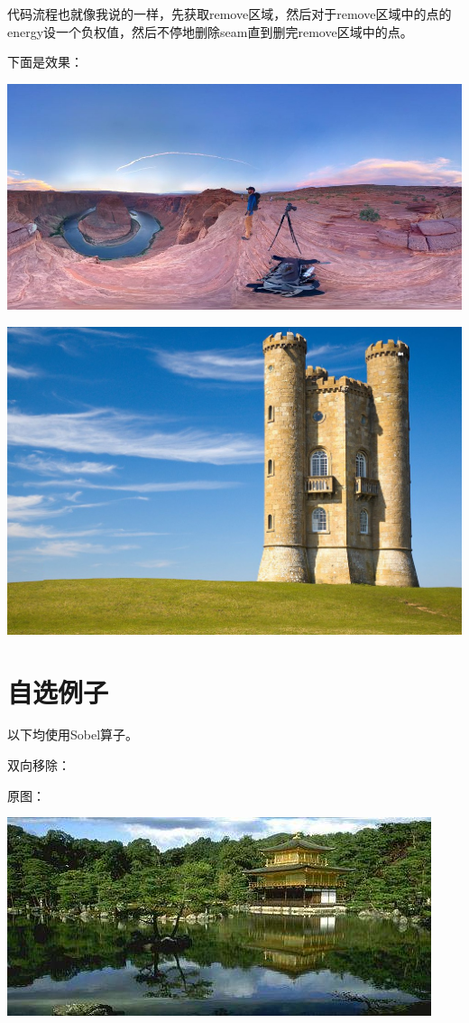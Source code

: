 \documentclass[10pt, a4paper]{article}
\begin{document}
    代码流程也就像我说的一样，先获取remove区域，然后对于remove区域中的点的energy设一个负权值，然后不停地删除seam直到删完remove区域中的点。

    下面是效果：

    \includegraphics[scale = .1]{5remove.jpg}

    \includegraphics[scale = .2]{1remove.jpg}
  \section{自选例子}

    以下均使用Sobel算子。

    双向移除：

    原图：

    \includegraphics[scale = .3]{input.jpeg}
\end{document}
